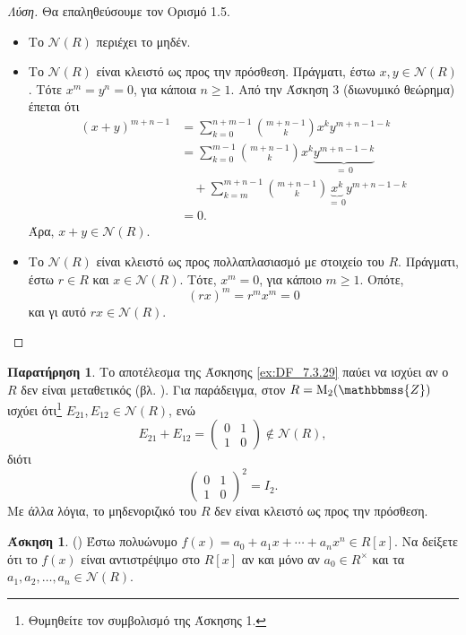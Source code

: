 \documentclass[12pt,a4paper,reqno]{amsart}
\theoremstyle{definition}
\newtheorem{exercise}{Άσκηση}
\newtheorem*{remark}{Παρατήρηση}
\newcommand{\ZZ}{\mathbbmss{Z}}
\newcommand{\nN}{\mathcal{N}}
\newcommand{\rmM}{\mathrm{M}}
\begin{document}
\begin{proof}[Λύση]
  Θα επαληθεύσουμε τον Ορισμό 1.5. 
  \begin{itemize}
    \item Το $\nN(R)$ περιέχει το μηδέν.
    \item Το $\nN(R)$ είναι κλειστό ως προς την πρόσθεση. Πράγματι, έστω $x, y \in \nN(R)$. Τότε $x^m = y^n = 0$, για κάποια $n \ge 1$. Από την Άσκηση 3 (διωνυμικό θεώρημα) έπεται ότι 
    \begin{align*}
    (x+y)^{m+n-1} 
    &= \sum_{k=0}^{n+m-1}\binom{m+n-1}{k} x^ky^{m+n-1-k} \\
    &= \sum_{k=0}^{m-1}\binom{m+n-1}{k}x^k\underbrace{y^{m+n-1-k}}_{= \, 0} \\
    &\quad + \sum_{k=m}^{m+n-1}\binom{m+n-1}{k}\underbrace{x^k}_{=\,0}y^{m+n-1-k} \\
    &= 0.
    \end{align*}
    Άρα, $x+y \in \nN(R)$.
    \item Το $\nN(R)$ είναι κλειστό ως προς πολλαπλασιασμό με στοιχείο του $R$. Πράγματι, έστω $r\in R$ και $x \in \nN(R)$. Τότε, $x^m=0$, για κάποιο $m \ge 1$. Οπότε, 
    \[
    (rx)^m = r^m x^m = 0
    \]
    και γι αυτό $rx \in \nN(R)$.
  \end{itemize}
\end{proof}

\begin{remark}
  Το αποτέλεσμα της Άσκησης \ref{ex:DF_7.3.29} παύει να ισχύει αν ο $R$ δεν είναι μεταθετικός (βλ. \cite[Άσκηση~7.3.31]{DF04}). Για παράδειγμα, στον $R = \rmM_2(\ZZ)$ ισχύει ότι\footnote{Θυμηθείτε τον συμβολισμό της Άσκησης 1.} $E_{21}, E_{12} \in \nN(R)$, ενώ
  \[
  E_{21} + E_{12} = \begin{pmatrix}
    0 & 1 \\
    1 & 0
  \end{pmatrix} \notin \nN(R),
  \]
  διότι 
  \[
  \begin{pmatrix}
    0 & 1 \\
    1 & 0
  \end{pmatrix}^2 = I_2.
  \]
  Με άλλα λόγια, το μηδενοριζικό του $R$ δεν είναι κλειστό ως προς την πρόσθεση.
\end{remark}

\begin{exercise}{\rm(\cite[Άσκηση~7.3.33]{DF04})}
  \label{ex:DF_7.3.33}
  Έστω πολυώνυμο $f(x) = a_0 + a_1x + \cdots + a_nx^n \in R[x]$.
  Να δείξετε ότι το $f(x)$ είναι αντιστρέψιμο στο $R[x]$ αν και μόνο αν $a_0 \in R^\times$ και τα $a_1, a_2, \dots, a_n \in \nN(R)$.
\end{exercise}
\end{document}
